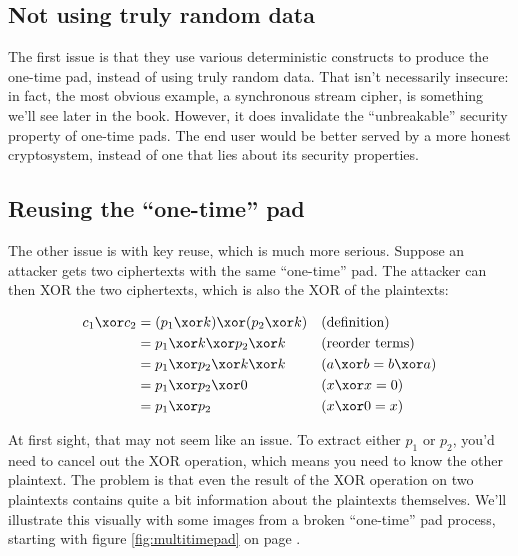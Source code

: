 \documentclass[11pt,ebook,table,dvipsnames]{memoir}
\begin{document}
\subsection{Not using truly random data}
\label{sec-2-1-5-1}

The first issue is that they use various deterministic constructs to
produce the one-time pad, instead of using truly random data. That
isn't necessarily insecure: in fact, the most obvious example, a
synchronous \gls{stream cipher}, is something we'll see later in the
book. However, it does invalidate the \enquote{unbreakable} security property
of one-time pads. The end user would be better served by a more honest
cryptosystem, instead of one that lies about its security properties.
\subsection{Reusing the \enquote{one-time} pad}
\label{sec-2-1-5-2}

The other issue is with key reuse, which is much more serious. Suppose
an attacker gets two ciphertexts with the same \enquote{one-time} pad. The
attacker can then XOR the two ciphertexts, which is also the XOR of
the plaintexts:

\begin{align*}
c_1 \xor c_2
&= (p_1 \xor k) \xor (p_2 \xor k) && (\text{definition})\\
&= p_1 \xor k \xor p_2 \xor k && (\text{reorder terms})\\
&= p_1 \xor p_2 \xor k \xor k && (a \xor b = b \xor a) \\
&= p_1 \xor p_2 \xor 0 && (x \xor x = 0) \\
&= p_1 \xor p_2 && (x \xor 0 = x)
\end{align*}

At first sight, that may not seem like an issue. To extract either
$p_1$ or $p_2$, you'd need to cancel out the XOR operation, which
means you need to know the other plaintext. The problem is that even
the result of the XOR operation on two plaintexts contains quite a bit
information about the plaintexts themselves. We'll illustrate this
visually with some images from a broken \enquote{one-time} pad process,
starting with figure \ref{fig:multitimepad} on page
\pageref{fig:multitimepad}.
\end{document}
